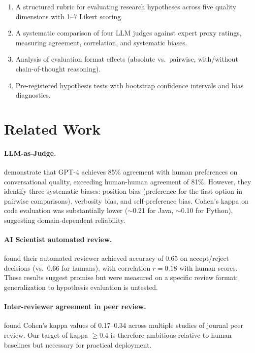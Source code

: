 \documentclass[11pt,a4paper]{article}
\begin{document}
\begin{enumerate}
  \item A structured rubric for evaluating research hypotheses across five
        quality dimensions with 1--7 Likert scoring.
  \item A systematic comparison of four LLM judges against expert proxy
        ratings, measuring agreement, correlation, and systematic biases.
  \item Analysis of evaluation format effects (absolute vs.\ pairwise,
        with/without chain-of-thought reasoning).
  \item Pre-registered hypothesis tests with bootstrap confidence intervals
        and bias diagnostics.
\end{enumerate}

\section{Related Work}
\label{sec:related}

\paragraph{LLM-as-Judge.}
\citet{zheng2023judging} demonstrate that GPT-4 achieves 85\% agreement
with human preferences on conversational quality, exceeding human-human
agreement of 81\%.  However, they identify three systematic biases:
position bias (preference for the first option in pairwise comparisons),
verbosity bias, and self-preference bias.  Cohen's kappa on code evaluation
was substantially lower ($\sim$0.21 for Java, $\sim$0.10 for Python),
suggesting domain-dependent reliability.

\paragraph{AI Scientist automated review.}
\citet{lu2024aiscientist} found their automated reviewer achieved accuracy
of 0.65 on accept/reject decisions (vs.\ 0.66 for humans), with
correlation $r = 0.18$ with human scores.  These results suggest promise
but were measured on a specific review format; generalization to hypothesis
evaluation is untested.

\paragraph{Inter-reviewer agreement in peer review.}
\citet{bornmann2010reliability} found Cohen's kappa values of 0.17--0.34
across multiple studies of journal peer review.  Our target of kappa
$\geq 0.4$ is therefore ambitious relative to human baselines but
necessary for practical deployment.
\end{document}
